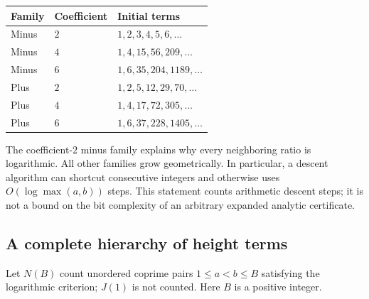 \begin{center}
\begin{tabular}{lll}
\toprule
Family & Coefficient & Initial terms\\
\midrule
Minus & $2$ & $1,2,3,4,5,6,\ldots$\\
Minus & $4$ & $1,4,15,56,209,\ldots$\\
Minus & $6$ & $1,6,35,204,1189,\ldots$\\
Plus & $2$ & $1,2,5,12,29,70,\ldots$\\
Plus & $4$ & $1,4,17,72,305,\ldots$\\
Plus & $6$ & $1,6,37,228,1405,\ldots$\\
\bottomrule
\end{tabular}
\end{center}

The coefficient-$2$ minus family explains why every neighboring ratio
is logarithmic. All other families grow geometrically. In particular,
a descent algorithm can shortcut consecutive integers and otherwise
uses $O(\log\max(a,b))$ steps. This statement counts arithmetic descent
steps; it is not a bound on the bit complexity of an arbitrary expanded
analytic certificate.

\subsection{A complete hierarchy of height terms}

Let $N(B)$ count unordered coprime pairs $1\le a<b\le B$ satisfying the
logarithmic criterion; $J(1)$ is not counted. Here $B$ is a positive
integer.

